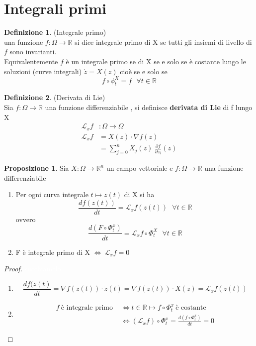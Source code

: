 \documentclass{article}
\theoremstyle{definition}
\newtheorem{definizione}{Definizione}[section]
\newtheorem*{proposizione}{Proposizione}
\newcommand{\R}{\mathbb{R}}
\newcommand{\Rn}{\R^n}
\begin{document}
 \section{Integrali primi}
 \begin{definizione}(Integrale primo) \\ 
 	una funzione $f:\Omega \rightarrow \R $ si dice integrale primo di X se tutti gli insiemi di livello di $f$ sono invarianti. \\ 
 	Equivalentemente $f$ è un integrale primo se di X se e solo se è costante lungo le soluzioni (curve integrali) $\dot{z}=X(z)$ cioè se e solo se $$f \circ \phi^X_t=f \ \ \ \forall t \in \R$$  
 	\end{definizione}
 	\begin{definizione}(Derivata di Lie) \\
 		Sia $f:\Omega \rightarrow \R $  una funzione differenziabile , si definisce \textbf{derivata di Lie} di f lungo X 
 		\begin{align*}
 			\mathscr{L}_xf &: \Omega \rightarrow \Omega \\ 
 				\mathscr{L}_xf &=X(z) \cdot \nabla f (z)\\
 				&=\sum_{j=0}^{n}X_j(z)\ \frac{\partial f}{\partial z_i}(z)
 		\end{align*}
 	\end{definizione}
 	\begin{proposizione}
 		Sia $X : \Omega \rightarrow \Rn$ un campo vettoriale e $f:\Omega \rightarrow \R $  una funzione differenziabile
 			\begin{enumerate}
 				\item Per ogni curva integrale $t \mapsto z(t)$ di X si ha $$\frac{df(z(t))}{dt}=\mathscr{L}_xf(z(t)) \ \ \ \forall t \in \R $$ ovvero $$\frac{d(F \circ \Phi_t^x)}{dt}=\mathscr{L}_xf\circ \Phi^X_t \ \ \ \forall t \in \R$$
 				\item F è integrale primo di X $\iff \ \mathscr{L}_xf=0$ 
 			\end{enumerate}
 	\end{proposizione}
 	\begin{proof} \textcolor{white}{succhiamelo}\\
 		\begin{enumerate}
 			\item $$\frac{df(z(t)}{dt}= \nabla f (z(t))\cdot  \dot{z}(t) =\nabla f (z(t))\cdot  X(z) = \mathscr{L}_x f (z(t))$$
 			\item 
 			\begin{align*}
 				f \ \text{è integrale primo } & \iff t \in \R \mapsto f \circ \Phi_t^x \ \text{è costante } \\ 
 				& \iff (\mathscr{L}_x f ) \circ \Phi_t^x = \frac{d(f \circ \Phi_t^x)}{dt}=0
 			\end{align*}
 		\end{enumerate}
 	\end{proof}
\end{document}
